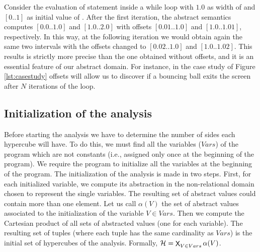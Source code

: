 Consider the evaluation of statement  inside a while loop with $1.0$ as width of  and $[0..1]$ as initial value of . After the first iteration, the abstract semantics computes $[0.0 .. 1.0]$ and $[1.0 .. 2.0]$ with offsets $[0.01 .. 1.0]$ and $[1.0 .. 1.01]$, respectively. In this way, at the following iteration we would obtain again the same two intervals with the offsets changed to $[0.02 .. 1.0]$ and $[1.0 .. 1.02]$. This results is strictly more precise than the one obtained without offsets, and it is an essential feature of our abstract domain. For instance, in the case study of Figure \ref{lst:casestudy} offsets will allow us to discover if a bouncing ball exits the screen after $N$ iterations of the  loop.

\vspace{-10pt}
\subsection{Initialization of the analysis} \label{sec:initialization}
\vspace{-5pt}
Before starting the analysis we have to determine the number of sides each hypercube will have. To do this, we must find all the variables ($Vars$) of the program which are not constants (i.e., assigned only once at the beginning of the program). %
We require the program to initialize all the variables at the beginning of the program. 
The initialization of the analysis is made in two steps. First, for each initialized variable, we compute its abstraction in the non-relational domain chosen to represent the single variables. The resulting set of abstract values could contain more than one element. Let us call $\alpha(V)$ the set of abstract values associated to the initialization of the variable $V \in Vars$. Then we compute the Cartesian product of all sets of abstracted values (one for each variable). The resulting set of tuples (where each tuple has the same cardinality as $Vars$) is the initial set of hypercubes of the analysis. 
Formally, $\adomain = \sbigtimes_{V \in Vars} {\alpha(V)}$.

